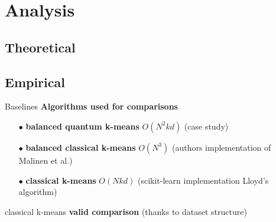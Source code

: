 \section{Analysis}
	\subsection{Theoretical}
	
	\subsection{Empirical}

		\begin{frame}{Baselines}
		\textbf{Algorithms used for comparisons}

		\begin{itemize}
			\item[$\bullet$] \textbf{balanced quantum k-means} $O(N^2kd)$ (case study) 
			\item[$\bullet$] \textbf{balanced classical k-means} $O(N^3)$ (authors implementation of Malinen et al.)
			\item[$\bullet$] \textbf{classical k-means} $O(Nkd)$ (scikit-learn implementation Lloyd's algorithm)
		\end{itemize}

		classical k-means \textbf{valid comparison} (thanks to dataset structure)

		
		\end{frame}

